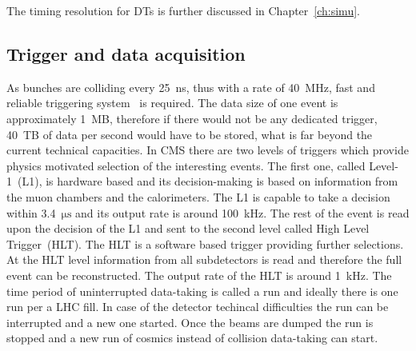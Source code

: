 \begin{description}
The timing resolution for DTs is further discussed in Chapter~\ref{ch:simu}.


\end{description}

\subsection{Trigger and data acquisition}

As bunches are colliding every 25~ns, thus with a rate of 40~MHz, fast and reliable triggering system~\cite{Khachatryan:2016bia} is required. The data size of one event is approximately 1~MB, therefore if there would not be any dedicated trigger, 40~TB of data per second would have to be stored, what is far beyond the current technical capacities. In CMS there are two levels of triggers which provide physics motivated selection of the interesting events. The first one, called Level-1~(L1), is hardware based and its decision-making is based on information from the muon chambers and the calorimeters. The L1 is capable to take a decision within 3.4~$\mathrm{\mu s}$ and its output rate is around 100~kHz. The rest of the event is read upon the decision of the L1 and sent to the second level called High Level Trigger~(HLT). The HLT is a software based trigger providing further selections. At the HLT level information from all subdetectors is read and therefore the full event can be reconstructed. The output rate of the HLT is around 1~kHz. The time period of uninterrupted data-taking is called a run and ideally there is one run per a LHC fill. In case of the detector techincal difficulties the run can be interrupted and a new one started. Once the beams are dumped the run is stopped and a new run of cosmics instead of collision data-taking can start.

